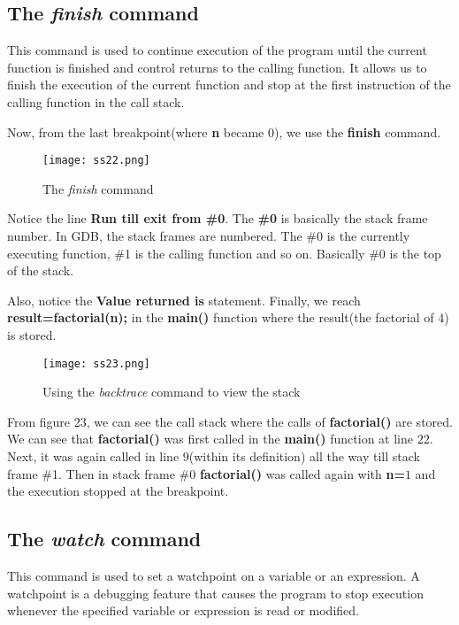 \documentclass{article}
\makeatletter
\renewcommand\paragraph{\@startsection{paragraph}{4}{\z@}{-3.25ex \@plus -1ex \@minus -.2ex}{1.5ex \@plus .2ex}{\normalfont\normalsize\bfseries}}
\makeatother
\begin{document}
\newpage
\subsection{The \textit{finish} command}
\paragraph{}
This command is used to continue execution of the program until the current function is finished and control returns to the calling function. It allows us to finish the execution of the current function and stop at the first instruction of the calling function in the call stack.

Now, from the last breakpoint(where \textbf{n} became $0$), we use the \textbf{finish} command.

\begin{figure}[h]
\centering
\texttt{[image: ss22.png]}
\caption{The \textit{finish} command}
\end{figure}

Notice the line \textbf{Run till exit from \#0}. The \textbf{\#0} is basically the stack frame number. In GDB, the stack frames are numbered. The \#0 is the currently executing function, \#1 is the calling function and so on. Basically \#0 is the top of the stack.

Also, notice the \textbf{Value returned is} statement.
\newpage
Finally, we reach \textbf{result=factorial(n);} in the \textbf{main()} function where the result(the factorial of $4$) is stored.

\begin{figure}[h]
\centering
\texttt{[image: ss23.png]}
\caption{Using the \textit{backtrace} command to view the stack}
\end{figure}

From figure 23, we can see the call stack where the calls of \textbf{factorial()} are stored. We can see that \textbf{factorial()} was first called in the \textbf{main()} function at line $22$. Next, it was again called in line $9$(within its definition) all the way till stack frame \#1. Then in stack frame \#0 \textbf{factorial()} was called again with \textbf{n=$1$} and the execution stopped at the breakpoint.

\newpage
\subsection{The \textit{watch} command}
\paragraph{}
This command is used to set a watchpoint on a variable or an expression. A watchpoint is a debugging feature that causes the program to stop execution whenever the specified variable or expression is read or modified.
\end{document}
